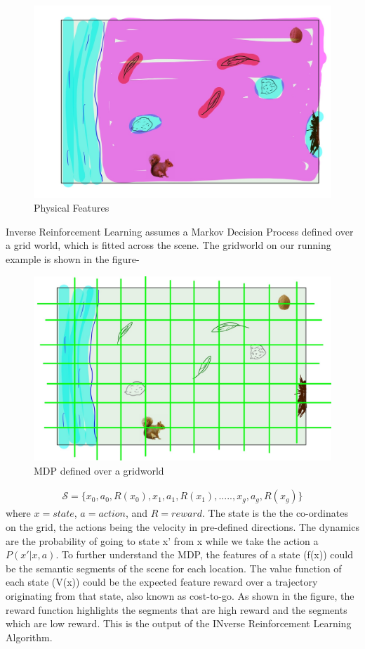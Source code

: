\documentclass[11pt]{article}
\begin{document}
\begin{figure}[H]
\centering
\includegraphics[width=0.8\linewidth]{figs/IMG_0210.JPG}
\caption{Physical Features}
\label{fig:pf}
\end{figure}
Inverse Reinforcement Learning assumes a Markov Decision Process defined over a grid world, which is fitted across the scene. The gridworld on our running example is shown in the figure-
\begin{figure}[H]
\centering
\includegraphics[width=0.8\linewidth]{figs/IMG_0211.JPG}
\caption{MDP defined over a gridworld}
\label{fig:mdp}
\end{figure}
\begin{align*}
    \mathcal{S} = \{x_0, a_0, R(x_0), x_1, a_1, R(x_1),....., x_g, a_g, R(x_g)\}
\end{align*}
where $x=state$, $a=action$, and $R=reward$. The state is the the co-ordinates on the grid, the actions being the velocity in pre-defined directions. The dynamics are the probability of going to state x' from x while we take the action a $P(x' | x,a)$. To further understand the MDP, the features of a state (f(x)) could be the semantic segments of the scene for each location. The value function of each state (V(x)) could be the expected feature reward over a trajectory originating from that state, also known as cost-to-go. \newline
As shown in the figure, the reward function highlights the segments that are high reward and the segments which are low reward. This is the output of the INverse Reinforcement Learning Algorithm.
\end{document}
